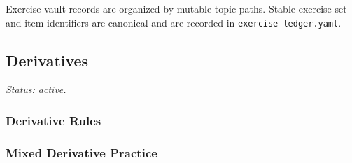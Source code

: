 
Exercise-vault records are organized by mutable topic paths. Stable exercise
set and item identifiers are canonical and are recorded in
\texttt{exercise-ledger.yaml}.

\subsection*{Derivatives}
\textit{Status: active.}

\subsubsection*{Derivative Rules}


\subsubsection*{Mixed Derivative Practice}

